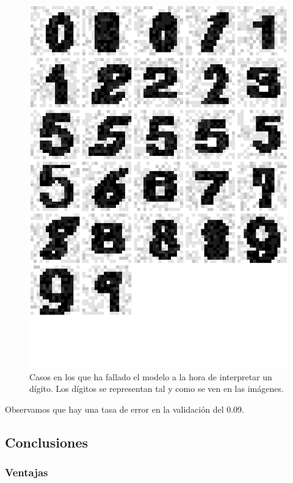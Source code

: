 \documentclass[12pt,spanish,a4paper]{article}
\numberwithin{equation}{section}
\begin{document}
\begin{figure}[h]

{\centering \includegraphics[width=0.8\linewidth]{graphics/svm/digitos_fallados_modelo_svm_linear2_paso2_b-1} 

}

\caption{Casos en los que ha fallado el modelo a la hora de interpretar un dígito. Los dígitos se representan tal y como se ven en las imágenes.}\label{fig:digitos_fallados_modelo_svm_linear2_paso2_b}
\end{figure}

Observamos que hay una tasa de error en la validación del 0.09.

\clearpage

\hypertarget{conclusiones}{%
\subsection{Conclusiones}\label{conclusiones}}

\hypertarget{ventajas}{%
\subsubsection{Ventajas}\label{ventajas}}
\end{document}
